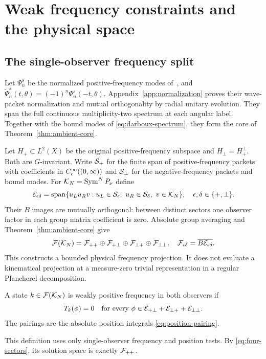 \section{Weak frequency constraints and the physical space}
\label{sec:physical}
\subsection{The single-observer frequency split}
Let $\Psi_n^s$ be the normalized positive-frequency modes of~\cite{KL},
and $\widetilde\Psi_n^s(t,\theta)=(-1)^n\Psi_n^s(-t,\theta)$.
Appendix~\ref{app:normalization} proves their wave-packet normalization
and mutual orthogonality by radial unitary evolution. They span the full
continuous multiplicity-two spectrum at each angular label. Together with
the bound modes of \eqref{eq:darboux-spectrum}, they form the core of
Theorem~\ref{thm:ambient-core}.

Let $H_+\subset L^2(X)$ be the original positive-frequency subspace and
$H_\perp=H_+^\perp$. Both are $G$-invariant. Write $\mathcal S_+$ for the finite
span of positive-frequency packets with coefficients in $C_c^\infty((0,\infty))$
and $\mathcal S_\perp$ for the negative-frequency packets and bound modes. For
$\mathcal K_N=\operatorname{Sym}^N P_\nu$ define
\begin{equation}
 \mathcal E_{\epsilon\delta}=\operatorname{span}\{u_Lu_Rv:
 u_L\in\mathcal S_\epsilon,\ u_R\in\mathcal S_\delta,\ v\in\mathcal K_N\},
 \quad \epsilon,\delta\in\{+,\perp\}.
\end{equation}
Their $B$ images are mutually orthogonal: between distinct sectors one
observer factor in each group matrix coefficient is zero. Absolute group
averaging and Theorem~\ref{thm:ambient-core} give
\begin{equation}
 \mathcal F(\mathcal K_N)=\mathcal F_{++}\oplus\mathcal F_{+\perp}
 \oplus\mathcal F_{\perp+}\oplus\mathcal F_{\perp\perp},\quad
 \mathcal F_{\epsilon\delta}=\overline{B\mathcal E_{\epsilon\delta}}.
 \label{eq:four-sectors}
\end{equation}
This constructs a bounded physical frequency projection. It does not
evaluate a kinematical projection at a measure-zero trivial representation
in a regular Plancherel decomposition.

\begin{definition}
A state $k\in\mathcal F(\mathcal K_N)$ is weakly positive frequency in both
observers if
\begin{equation}
 T_k(\phi)=0\quad\text{for every }\phi\in
 \mathcal E_{+\perp}+\mathcal E_{\perp+}+\mathcal E_{\perp\perp}.
 \label{eq:weak-positive}
\end{equation}
The pairings are the absolute position integrals \eqref{eq:position-pairing}.
\end{definition}
This definition uses only single-observer frequency and position tests.
By \eqref{eq:four-sectors}, its solution space is exactly $\mathcal F_{++}$.

